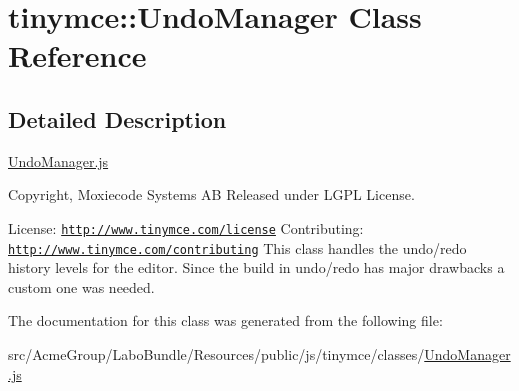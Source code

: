 \hypertarget{classtinymce_1_1_undo_manager}{\section{tinymce\+:\+:Undo\+Manager Class Reference}
\label{classtinymce_1_1_undo_manager}
}


\subsection{Detailed Description}
\hyperlink{_undo_manager_8js}{Undo\+Manager.\+js}

Copyright, Moxiecode Systems A\+B Released under L\+G\+P\+L License.

License\+: \href{http://www.tinymce.com/license}{\tt http\+://www.\+tinymce.\+com/license} Contributing\+: \href{http://www.tinymce.com/contributing}{\tt http\+://www.\+tinymce.\+com/contributing} This class handles the undo/redo history levels for the editor. Since the build in undo/redo has major drawbacks a custom one was needed. 

The documentation for this class was generated from the following file\+:\begin{DoxyCompactItemize}
\item 
src/\+Acme\+Group/\+Labo\+Bundle/\+Resources/public/js/tinymce/classes/\hyperlink{_undo_manager_8js}{Undo\+Manager.\+js}\end{DoxyCompactItemize}
